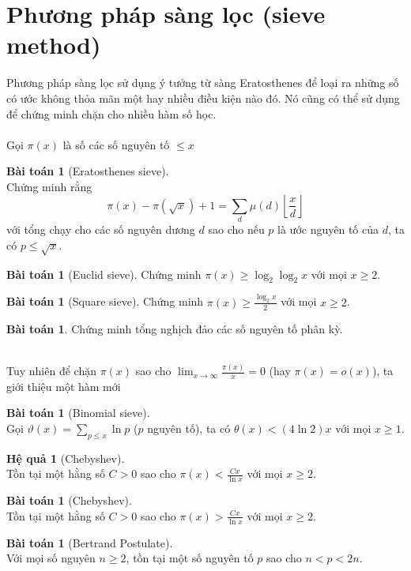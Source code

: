\documentclass{article}
\theoremstyle{definition}
\newtheorem{corollary}[theorem]{Hệ quả}
\newtheorem{exercise}[theorem]{Bài toán}
\begin{document}
\section{Phương pháp sàng lọc (sieve method)}
Phương pháp sàng lọc sử dụng ý tưởng từ sàng Eratosthenes để loại ra những số có ước không thỏa mãn một hay nhiều điều kiện nào đó. Nó cũng có thể sử dụng để chứng minh chặn cho nhiều hàm số học.
\\
\\
Gọi $\pi(x)$ là số các số nguyên tố $\leq x$
\begin{exercise}[Eratosthenes sieve] \ \\
Chứng minh rằng
$$\pi(x) - \pi(\sqrt{x}) + 1 = \sum_d \mu (d) \left\lfloor \frac{x}{d} \right\rfloor$$
với tổng chạy cho các số nguyên dương $d$ sao cho nếu $p$ là ước nguyên tố của $d$, ta có $p \leq \sqrt{x}$.
\end{exercise}
\begin{exercise}[Euclid sieve]
Chứng minh $\pi(x) \geq \log_2 \log_2 x$ với mọi $x \geq 2$.
\end{exercise}
\begin{exercise}[Square sieve]
Chứng minh $\pi(x) \geq \frac{\log_2 x}{2}$ với mọi $x \geq 2$.
\end{exercise}
\begin{exercise}
Chứng minh tổng nghịch đảo các số nguyên tố phân kỳ.
\end{exercise}
\ \\
Tuy nhiên để chặn $\pi(x)$ sao cho $\lim_{x \to \infty} \frac{\pi(x)}{x} = 0$ (hay $\pi(x) = o(x)$), ta giới thiệu một hàm mới
\begin{exercise}[Binomial sieve] \ \\
Gọi $\vartheta(x) = \sum_{p \leq x} \ln p$ ($p$ nguyên tố), ta có $\theta(x) < (4 \ln 2) x$ với mọi $x \geq 1$.
\end{exercise}
\begin{corollary}[Chebyshev] \ \\
Tồn tại một hằng số $C > 0$ sao cho $\pi(x) < \frac{Cx}{\ln x}$ với mọi $x \geq 2$.
\end{corollary}
\begin{exercise}[Chebyshev] \ \\
Tồn tại một hằng số $C > 0$ sao cho $\pi(x) > \frac{Cx}{\ln x}$ với mọi $x \geq 2$.
\end{exercise}
\begin{exercise}[Bertrand Postulate] \ \\
Với mọi số nguyên $n \geq 2$, tồn tại một số nguyên tố $p$ sao cho $n < p < 2n$.
\end{exercise}
\end{document}
